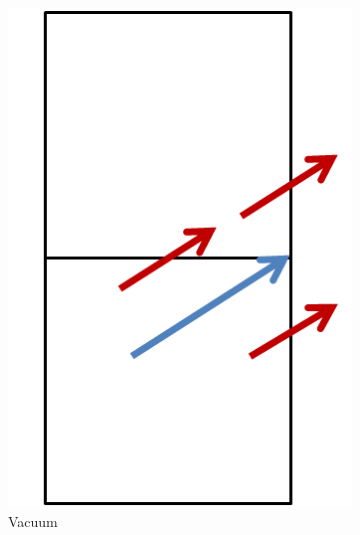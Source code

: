 \begin{figure}[h!]
	\centering
	\begin{subfigure}{0.45\textwidth}
		\centering
		\includegraphics[width=\linewidth]{figures/DD/split-vacuum.PNG}
		\caption{Vacuum}
		\label{fig:split-vacuum}
	\end{subfigure}
	\begin{subfigure}{0.45\textwidth}
		\centering

\end{subfigure}
\end{figure}
